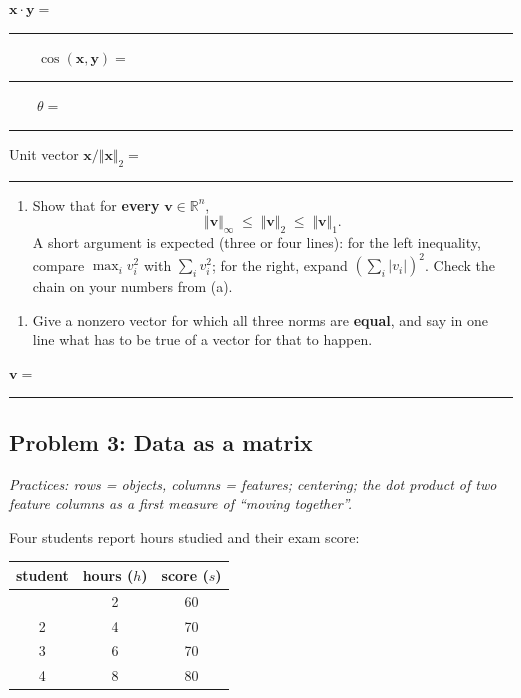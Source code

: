 \documentclass[
  11pt,
]{article}
\providecommand{\tightlist}{%
  \setlength{\itemsep}{0pt}\setlength{\parskip}{0pt}}
\newcommand{\answerspace}[1]{\par\vspace*{#1}}  %
\newcommand{\blank}[1][1.2in]{\rule{#1}{0.4pt}}
\newcommand{\answerpage}{\clearpage}
\begin{document}
\(\mathbf{x}\cdot\mathbf{y} =\)
\blank[0.8in] \(\qquad \cos(\mathbf{x},\mathbf{y}) =\)
\blank[0.8in] \(\qquad \theta =\) \blank[1.4in]

Unit vector \(\mathbf{x}/\Vert\mathbf{x}\Vert_2 =\) \blank[1.6in]

\answerspace{2in}

\begin{enumerate}
\def\labelenumi{(\alph{enumi})}
\setcounter{enumi}{2}
\tightlist
\item
  Show that for \textbf{every} \(\mathbf{v}\in\mathbb{R}^n\),
  \[\Vert\mathbf{v}\Vert_\infty \;\le\; \Vert\mathbf{v}\Vert_2 \;\le\; \Vert\mathbf{v}\Vert_1 .\]
  A short argument is expected (three or four lines): for the left
  inequality, compare \(\max_i v_i^2\) with \(\sum_i v_i^2\); for the
  right, expand \((\sum_i |v_i|)^2\). Check the chain on your numbers
  from (a).
\end{enumerate}

\answerspace{2.8in}

\begin{enumerate}
\def\labelenumi{(\alph{enumi})}
\setcounter{enumi}{3}
\tightlist
\item
  Give a nonzero vector for which all three norms are \textbf{equal},
  and say in one line what has to be true of a vector for that to
  happen.
\end{enumerate}

\(\mathbf{v} =\) \blank[1.4in]

\answerspace{1in}

\answerpage

\subsection{Problem 3: Data as a
matrix}\label{problem-3-data-as-a-matrix}

\emph{Practices: rows = objects, columns = features; centering; the dot
product of two feature columns as a first measure of ``moving
together''.}

Four students report hours studied and their exam score:

\begin{longtable}[]{@{}ccc@{}}
\toprule\noalign{}
student & hours (\(h\)) & score (\(s\)) \\
\midrule\noalign{}
\endhead
\bottomrule\noalign{}
\endlastfoot
1 & 2 & 60 \\
2 & 4 & 70 \\
3 & 6 & 70 \\
4 & 8 & 80 \\
\end{longtable}
\end{document}
